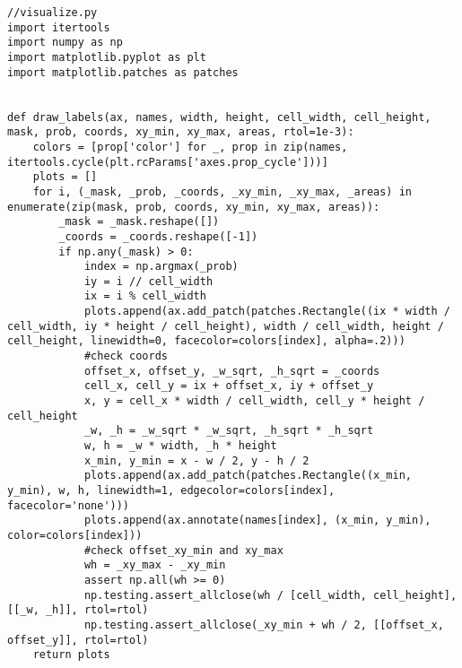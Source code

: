 \pagebreak
\begin{lstlisting}
//visualize.py
import itertools
import numpy as np
import matplotlib.pyplot as plt
import matplotlib.patches as patches


def draw_labels(ax, names, width, height, cell_width, cell_height, mask, prob, coords, xy_min, xy_max, areas, rtol=1e-3):
    colors = [prop['color'] for _, prop in zip(names, itertools.cycle(plt.rcParams['axes.prop_cycle']))]
    plots = []
    for i, (_mask, _prob, _coords, _xy_min, _xy_max, _areas) in enumerate(zip(mask, prob, coords, xy_min, xy_max, areas)):
        _mask = _mask.reshape([])
        _coords = _coords.reshape([-1])
        if np.any(_mask) > 0:
            index = np.argmax(_prob)
            iy = i // cell_width
            ix = i % cell_width
            plots.append(ax.add_patch(patches.Rectangle((ix * width / cell_width, iy * height / cell_height), width / cell_width, height / cell_height, linewidth=0, facecolor=colors[index], alpha=.2)))
            #check coords
            offset_x, offset_y, _w_sqrt, _h_sqrt = _coords
            cell_x, cell_y = ix + offset_x, iy + offset_y
            x, y = cell_x * width / cell_width, cell_y * height / cell_height
            _w, _h = _w_sqrt * _w_sqrt, _h_sqrt * _h_sqrt
            w, h = _w * width, _h * height
            x_min, y_min = x - w / 2, y - h / 2
            plots.append(ax.add_patch(patches.Rectangle((x_min, y_min), w, h, linewidth=1, edgecolor=colors[index], facecolor='none')))
            plots.append(ax.annotate(names[index], (x_min, y_min), color=colors[index]))
            #check offset_xy_min and xy_max
            wh = _xy_max - _xy_min
            assert np.all(wh >= 0)
            np.testing.assert_allclose(wh / [cell_width, cell_height], [[_w, _h]], rtol=rtol)
            np.testing.assert_allclose(_xy_min + wh / 2, [[offset_x, offset_y]], rtol=rtol)
    return plots


\end{lstlisting}

